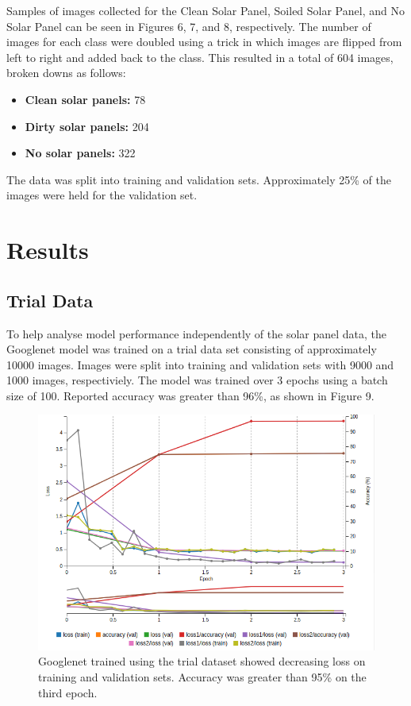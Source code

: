 \documentclass[10pt,journal,compsoc]{IEEEtran}
\begin{document}
		Samples of images collected for the Clean Solar Panel, Soiled Solar Panel, and No Solar Panel can be seen in Figures 6, 7, and 8, respectively. The number of images for each class were doubled using a trick in which images are flipped from left to right and added back to the class. This resulted in a total of 604 images, broken downs as follows:
		
		\begin{itemize}
			\item \textbf{Clean solar panels:} 78
			\item \textbf{Dirty solar panels:} 204
			\item \textbf{No solar panels:} 322
		\end{itemize}
		
		The data was split into training and validation sets. Approximately 25\% of the images were held for the validation set.
		
		\section{Results}
		\subsection{Trial Data}
		To help analyse model performance independently of the solar panel data, the Googlenet model was trained on a trial data set consisting of approximately 10000 images. Images were split into training and validation sets with 9000 and 1000 images, respectiviely. The model was trained over 3 epochs using a batch size of 100. Reported accuracy was greater than 96\%, as shown in Figure 9. 
		\begin{figure}[h]
			\centering
			\includegraphics[scale=0.3]{trial_data_model_train}
			\caption{Googlenet trained using the trial dataset showed decreasing loss on training and validation sets. Accuracy was greater than 95\% on the third epoch.}
		\end{figure}
		
\end{document}
